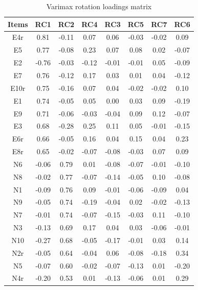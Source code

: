 \documentclass[
  english,
  man]{apa6}
\begin{document}
\begin{table}[tbp]

\begin{center}
\begin{threeparttable}

\caption{\label{tab:varimaxTable}Varimax rotation loadings matrix}

\tiny{

\begin{tabular}{cccccccc}
\toprule
Items & \multicolumn{1}{c}{RC1} & \multicolumn{1}{c}{RC2} & \multicolumn{1}{c}{RC4} & \multicolumn{1}{c}{RC3} & \multicolumn{1}{c}{RC5} & \multicolumn{1}{c}{RC7} & \multicolumn{1}{c}{RC6}\\
\midrule
E4r & 0.81 & -0.11 & 0.07 & 0.06 & -0.03 & -0.02 & 0.09\\
E5 & 0.77 & -0.08 & 0.23 & 0.07 & 0.08 & 0.02 & -0.07\\
E2 & -0.76 & -0.03 & -0.12 & -0.01 & -0.01 & 0.05 & -0.09\\
E7 & 0.76 & -0.12 & 0.17 & 0.03 & 0.01 & 0.04 & -0.12\\
E10r & 0.75 & -0.16 & 0.07 & 0.04 & -0.02 & -0.02 & 0.10\\
E1 & 0.74 & -0.05 & 0.05 & 0.00 & 0.03 & 0.09 & -0.19\\
E9 & 0.71 & -0.06 & -0.03 & -0.04 & 0.09 & 0.12 & -0.07\\
E3 & 0.68 & -0.28 & 0.25 & 0.11 & 0.05 & -0.01 & -0.15\\
E6r & 0.66 & -0.05 & 0.16 & 0.04 & 0.15 & 0.04 & 0.23\\
E8r & 0.65 & -0.02 & -0.07 & -0.08 & -0.03 & 0.07 & 0.09\\
N6 & -0.06 & 0.79 & 0.01 & -0.08 & -0.07 & -0.01 & -0.10\\
N8 & -0.02 & 0.77 & -0.07 & -0.14 & -0.05 & 0.10 & -0.08\\
N1 & -0.09 & 0.76 & 0.09 & -0.01 & -0.06 & -0.09 & 0.04\\
N9 & -0.05 & 0.74 & -0.19 & -0.04 & 0.02 & -0.02 & -0.13\\
N7 & -0.01 & 0.74 & -0.07 & -0.15 & -0.03 & 0.11 & -0.10\\
N3 & -0.13 & 0.69 & 0.17 & 0.04 & 0.03 & -0.06 & -0.01\\
N10 & -0.27 & 0.68 & -0.05 & -0.17 & -0.01 & 0.03 & 0.14\\
N2r & -0.05 & 0.64 & -0.04 & 0.06 & -0.08 & -0.18 & 0.34\\
N5 & -0.07 & 0.60 & -0.02 & -0.07 & -0.13 & 0.01 & -0.20\\
N4r & -0.20 & 0.53 & 0.01 & -0.13 & -0.06 & 0.01 & 0.29\\

\end{tabular}}
\end{threeparttable}
\end{center}
\end{table}
\end{document}
